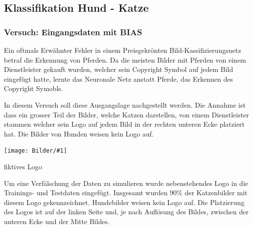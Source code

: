 \documentclass[
  12pt, %
  a4paper, %
  oneside, %
  openany, 
  numbers=noenddot, %
  BCOR=5mm, %
  parskip=half*, %
  thesis, %
]{bfhbook}
\newcommand{\imgText}[3]{
\begin{center}
    \begin{minipage}[t]{0.6\textwidth}
    		\vspace{0pt}
		\texttt{[image: Bilder/\#1]}
		\caption{#2}
	\end{minipage}\hfill
    \begin{minipage}[t]{0.4\textwidth}
    		\vspace{0pt}
  		#3
    \end{minipage}
\end{center}
}
\begin{document}
\subsection{Klassifikation Hund - Katze}

\subsubsection*{Versuch: Eingangsdaten mit BIAS}
Ein oftmals Erwähnter Fehler in einem Preisgekrönten Bild-Kassifizierungsnetz betraf die Erkennung von Pferden. Da die meisten Bilder mit Pferden von einem Dienstleister gekauft wurden, welcher sein Copyright Symbol auf jedem Bild eingefügt hatte, lernte das Neuronale Netz anstatt Pferde, das Erkennen des Copyright Symobls.

\break
In diesem Versuch soll diese Ausgangslage nachgestellt werden. Die Annahme ist dass ein grosser Teil der Bilder, welche Katzen darstellen, von einem Dienstleister stammen welcher sein Logo auf jedem Bild in der rechten unteren Ecke platziert hat. Die Bilder von Hunden weisen kein Logo auf.
\imgText{watermark.jpg}{fiktives Logo}{
Um eine Verfälschung der Daten zu simulieren wurde nebenstehendes Logo in die Trainings- und Testdaten eingefügt. 
\break 
Insgesamt wurden 90\% der Katzenbilder mit diesem Logo gekennzeichnet. Hundebilder weisen kein Logo auf. \break Die Platzierung des Logos ist auf der linken Seite und, je nach Auflösung des Bildes, zwischen der unteren Ecke und der Mitte Bildes.
}
\end{document}
